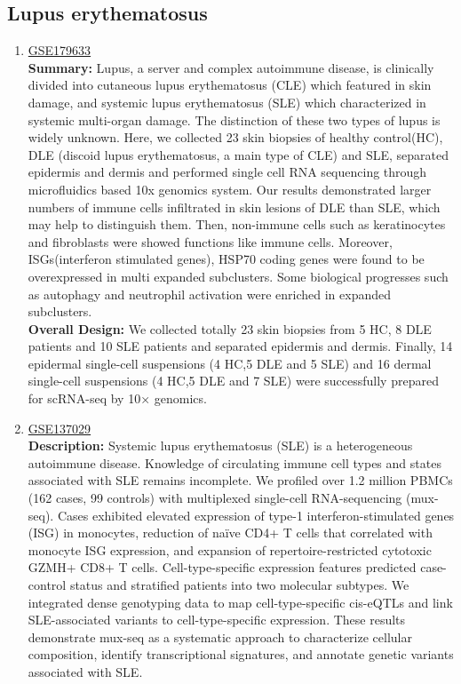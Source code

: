 \documentclass[times, twoside, watermark]{zHenriquesLab-StyleBioRxiv}
\begin{document}
\subsection{Lupus erythematosus}
\begin{enumerate}
	\item \href{https://www.ncbi.nlm.nih.gov/geo/query/acc.cgi?acc=GSE179633}{GSE179633} \cite{Zheng_2022} \texttt{}
			\\ \textbf{Summary:}
			Lupus, a server and complex autoimmune disease, is clinically divided into cutaneous lupus erythematosus (CLE) which featured in skin damage, and systemic lupus erythematosus (SLE) which characterized in systemic multi-organ damage. The distinction of these two types of lupus is widely unknown. Here, we collected 23 skin biopsies of healthy control(HC), DLE (discoid lupus erythematosus, a main type of CLE) and SLE, separated epidermis and dermis and performed single cell RNA sequencing through microfluidics based 10x genomics system. Our results demonstrated larger numbers of immune cells infiltrated in skin lesions of DLE than SLE, which may help to distinguish them. Then, non-immune cells such as keratinocytes and fibroblasts were showed functions like immune cells. Moreover, ISGs(interferon stimulated genes), HSP70 coding genes were found to be overexpressed in multi expanded subclusters. Some biological progresses such as autophagy and neutrophil activation were enriched in expanded subclusters.
			\\ \textbf{Overall Design:}
			We collected totally 23 skin biopsies from 5 HC, 8 DLE patients and 10 SLE patients and separated epidermis and dermis. Finally, 14 epidermal single-cell suspensions (4 HC,5 DLE and 5 SLE) and 16 dermal single-cell suspensions (4 HC,5 DLE and 7 SLE) were successfully prepared for scRNA-seq by 10× genomics.
	\item \href{https://cellxgene.cziscience.com/collections/436154da-bcf1-4130-9c8b-120ff9a888f2}{GSE137029} \cite{perez2022} 
			\\ \textbf{Description:}
			Systemic lupus erythematosus (SLE) is a heterogeneous autoimmune disease. Knowledge of circulating immune cell types and states associated with SLE remains incomplete. We profiled over 1.2 million PBMCs (162 cases, 99 controls) with multiplexed single-cell RNA-sequencing (mux-seq). Cases exhibited elevated expression of type-1 interferon-stimulated genes (ISG) in monocytes, reduction of naïve CD4+ T cells that correlated with monocyte ISG expression, and expansion of repertoire-restricted cytotoxic GZMH+ CD8+ T cells. Cell-type-specific expression features predicted case-control status and stratified patients into two molecular subtypes. We integrated dense genotyping data to map cell-type-specific cis-eQTLs and link SLE-associated variants to cell-type-specific expression. These results demonstrate mux-seq as a systematic approach to characterize cellular composition, identify transcriptional signatures, and annotate genetic variants associated with SLE.

\end{enumerate}
\end{document}
